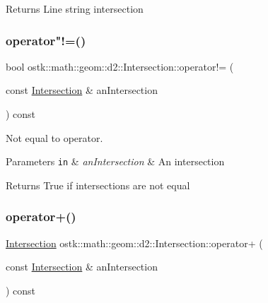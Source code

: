 \begin{DoxyReturn}{Returns}
Line string intersection 
\end{DoxyReturn}
\mbox{\label{classostk_1_1math_1_1geom_1_1d2_1_1_intersection_a6a5cd04fff08e2bd74d99a29544b7fe2}} 
\subsubsection{\texorpdfstring{operator"!=()}{operator!=()}}
{\footnotesize\ttfamily bool ostk\+::math\+::geom\+::d2\+::\+Intersection\+::operator!= (\begin{DoxyParamCaption}\item[{const \hyperlink{classostk_1_1math_1_1geom_1_1d2_1_1_intersection}{Intersection} \&}]{an\+Intersection }\end{DoxyParamCaption}) const}



Not equal to operator. 


\begin{DoxyParams}[1]{Parameters}
\mbox{\tt in}  & {\em an\+Intersection} & An intersection \\
\hline
\end{DoxyParams}
\begin{DoxyReturn}{Returns}
True if intersections are not equal 
\end{DoxyReturn}
\mbox{\label{classostk_1_1math_1_1geom_1_1d2_1_1_intersection_ad09a3d32aaf36b85cc8899c724234e9c}} 
\subsubsection{\texorpdfstring{operator+()}{operator+()}}
{\footnotesize\ttfamily \hyperlink{classostk_1_1math_1_1geom_1_1d2_1_1_intersection}{Intersection} ostk\+::math\+::geom\+::d2\+::\+Intersection\+::operator+ (\begin{DoxyParamCaption}\item[{const \hyperlink{classostk_1_1math_1_1geom_1_1d2_1_1_intersection}{Intersection} \&}]{an\+Intersection }\end{DoxyParamCaption}) const}



